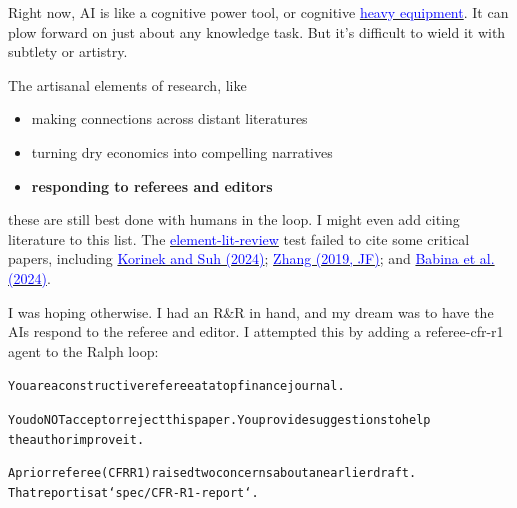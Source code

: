 \documentclass[12pt]{article}
\begin{document}
\begin{mdframed}[
linewidth=1pt,
linecolor=black,
innerleftmargin=0.25em,
innerrightmargin=0.25em,
innertopmargin=0.2\baselineskip,
innerbottommargin=0.8\baselineskip
]
Right now, AI is like a cognitive power tool, or cognitive \href{https://en.wikipedia.org/wiki/Heavy_equipment}{\textcolor{blue}{heavy equipment}}. It can plow forward on just about any knowledge task. But it's difficult to wield it with subtlety or artistry.

The artisanal elements of research, like

\vspace{-2ex}
\begin{itemize}
\setlength{\itemsep}{0.15em}
\setlength{\parskip}{0pt}
\item making connections across distant literatures
\item turning dry economics into compelling narratives
\item \textbf{responding to referees and editors}
\end{itemize}
\vspace{-2ex}

these are still best done with humans in the loop. I might even add citing literature to this list. The \href{https://github.com/redacted/ralph-wiggum-asset-pricing/blob/main/tests/element-lit-review.py}{\textcolor{blue}{element-lit-review}} test failed to cite some critical papers, including \href{https://arxiv.org/abs/2403.12107v1}{\textcolor{blue}{Korinek and Suh (2024)}}; \href{https://onlinelibrary.wiley.com/doi/abs/10.1111/jofi.12766}{\textcolor{blue}{Zhang (2019, JF)}}; and \href{https://papers.ssrn.com/sol3/papers.cfm?abstract_id=4868770}{\textcolor{blue}{Babina et al. (2024)}}.

I was hoping otherwise. I had an R\&R in hand, and my dream was to have the AIs respond to the referee and editor. I attempted this by adding a \colorbox{gray!10}{\textcolor{red!70!black}{referee-cfr-r1}} agent to the Ralph loop:

\begin{mdframed}[backgroundcolor=gray!10,linewidth=0.6pt,linecolor=gray!70,roundcorner=2pt,innerleftmargin=0.6em,innerrightmargin=0.6em,innertopmargin=0.5\baselineskip,innerbottommargin=0.5\baselineskip]
\begingroup
\small
\setlength{\parindent}{0pt}
\setlength{\parskip}{0pt}
\begin{alltt}

You are a constructive referee at a top finance journal.

You do NOT accept or reject this paper. You provide suggestions to help 
the author improve it.

A prior referee (CFR R1) raised two concerns about an earlier draft. 
That report is at `spec/CFR-R1-report`.
\end{alltt}
\endgroup
\end{mdframed}


\end{mdframed}
\end{document}
